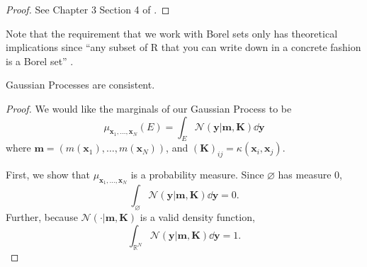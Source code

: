 \begin{proof}
    See Chapter 3 Section 4 of \cite{kolmogorov1933}.
\end{proof}

Note that the requirement that we work with Borel sets only has theoretical implications since 
``any subset of R that you can write down in a concrete fashion is a Borel set'' \cite{axler2020}.

\begin{theorem}
    \label{thm:gp-const}
    Gaussian Processes are consistent.
\end{theorem}
\begin{proof}
    We would like the marginals of our Gaussian Process to be
    \begin{equation*}
        \mu_{\mathbf{x}_1, \dots, \mathbf{x}_N}(E)
        = \int_{E} \mathcal{N}( \mathbf{y} | \mathbf{m}, \mathbf{K}) \dd \mathbf{y}
    \end{equation*}
    where $\mathbf{m} = (m(\mathbf{x}_1), \dots, m(\mathbf{x}_N))$, and $(\mathbf{K})_{ij} = \kappa(\mathbf{x}_i, \mathbf{x}_j)$.

    First, we show that $\mu_{\mathbf{x}_1, \dots, \mathbf{x}_N}$ is a probability measure.
    Since $\varnothing$ has measure 0,
    \begin{equation*}
        \int_{\varnothing} \mathcal{N}(\mathbf{y} | \mathbf{m}, \mathbf{K}) \dd \mathbf{y} = 0.
    \end{equation*}
    Further, because $\mathcal{N}( \cdot | \mathbf{m}, \mathbf{K})$ is a valid density function,
    \begin{equation*}
        \int_{\mathbb{R}^{N}} \mathcal{N}(\mathbf{y} | \mathbf{m}, \mathbf{K}) \dd \mathbf{y} = 1.
    \end{equation*}


\end{proof}
